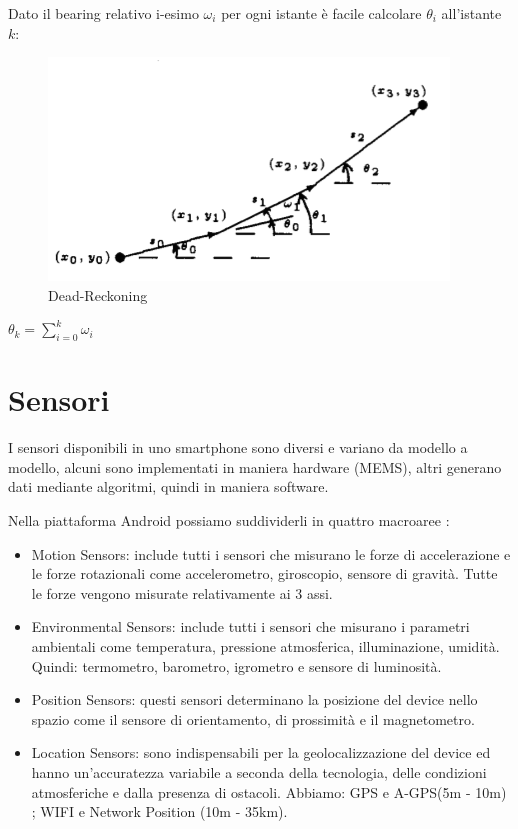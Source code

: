 \documentclass[12pt,a4paper,openright,twoside]{report}
\begin{document}
Dato il bearing relativo i-esimo $\omega_i$ per ogni istante è facile calcolare $\theta_i$ all'istante $k$:

\begin{figure}[h] 
\centering 
\includegraphics[scale=0.8]{fig1} 
\caption{Dead-Reckoning} 
\end{figure}

\begin{center}
$\theta_k = \sum_{i=0}^k \omega_i$
\end{center}

\section {Sensori}

I sensori disponibili in uno smartphone sono diversi e variano da modello a modello, alcuni sono implementati in maniera hardware (MEMS), altri generano dati mediante algoritmi, quindi in maniera software. 

Nella piattaforma Android possiamo suddividerli in quattro macroaree \cite{K9}:
\begin{itemize}
\item Motion Sensors: include tutti i sensori che misurano le forze di accelerazione e le forze rotazionali come accelerometro, giroscopio, sensore di gravità. Tutte le forze vengono misurate relativamente ai 3 assi.
\item Environmental Sensors: include tutti i sensori che misurano i parametri ambientali come temperatura, pressione atmosferica, illuminazione, umidità. Quindi: termometro, barometro, igrometro e sensore di luminosità.
\item Position Sensors: questi sensori determinano la posizione del device nello spazio come il sensore di orientamento, di prossimità e il magnetometro.
\item Location Sensors: sono indispensabili per la geolocalizzazione del device ed hanno un'accuratezza variabile a seconda della tecnologia, delle condizioni atmosferiche e dalla presenza di ostacoli. Abbiamo: GPS e A-GPS(5m - 10m) \cite{K10}; WIFI e Network Position (10m - 35km).
\end{itemize}
\end{document}
